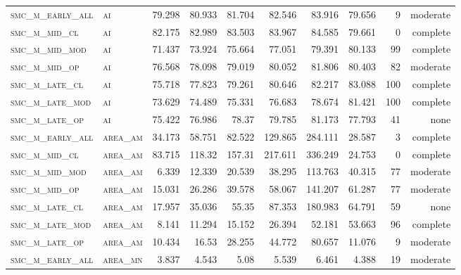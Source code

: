 \begin{landscape}
\begin{center}
\begin{footnotesize}
\begin{longtable}{llrrrrr|rrr}
\textsc{smc\_m\_early\_all} & \textsc{ai        }   & 79.298   & 80.933   & 81.704   & 82.546   & 83.916   & 79.656   & 9   & moderate \\
\textsc{smc\_m\_mid\_cl   } & \textsc{ai        }   & 82.175   & 82.989   & 83.503   & 83.967   & 84.585   & 79.661   & 0   & complete \\
\textsc{smc\_m\_mid\_mod  } & \textsc{ai        }   & 71.437   & 73.924   & 75.664   & 77.051   & 79.391   & 80.133   & 99  & complete \\
\textsc{smc\_m\_mid\_op   } & \textsc{ai        }   & 76.568   & 78.098   & 79.019   & 80.052   & 81.806   & 80.403   & 82  & moderate \\
\textsc{smc\_m\_late\_cl  } & \textsc{ai        }   & 75.718   & 77.823   & 79.261   & 80.646   & 82.217   & 83.088   & 100 & complete \\
\textsc{smc\_m\_late\_mod } & \textsc{ai        }   & 73.629   & 74.489   & 75.331   & 76.683   & 78.674   & 81.421   & 100 & complete \\
\textsc{smc\_m\_late\_op  } & \textsc{ai        }   & 75.422   & 76.986   & 78.37    & 79.785   & 81.173   & 77.793   & 41  & none     \\
\textsc{smc\_m\_early\_all} & \textsc{area\_am  }   & 34.173   & 58.751   & 82.522   & 129.865  & 284.111  & 28.587   & 3   & complete \\
\textsc{smc\_m\_mid\_cl   } & \textsc{area\_am  }   & 83.715   & 118.32   & 157.31   & 217.611  & 336.249  & 24.753   & 0   & complete \\
\textsc{smc\_m\_mid\_mod  } & \textsc{area\_am  }   & 6.339    & 12.339   & 20.539   & 38.295   & 113.763  & 40.315   & 77  & moderate \\
\textsc{smc\_m\_mid\_op   } & \textsc{area\_am  }   & 15.031   & 26.286   & 39.578   & 58.067   & 141.207  & 61.287   & 77  & moderate \\
\textsc{smc\_m\_late\_cl  } & \textsc{area\_am  }   & 17.957   & 35.036   & 55.35    & 87.353   & 180.983  & 64.791   & 59  & none     \\
\textsc{smc\_m\_late\_mod } & \textsc{area\_am  }   & 8.141    & 11.294   & 15.152   & 26.394   & 52.181   & 53.663   & 96  & complete \\
\textsc{smc\_m\_late\_op  } & \textsc{area\_am  }   & 10.434   & 16.53    & 28.255   & 44.772   & 80.657   & 11.076   & 9   & moderate \\
\textsc{smc\_m\_early\_all} & \textsc{area\_mn  }   & 3.837    & 4.543    & 5.08     & 5.539    & 6.461    & 4.388    & 19  & moderate \\

\end{longtable}
\end{footnotesize}
\end{center}
\end{landscape}
